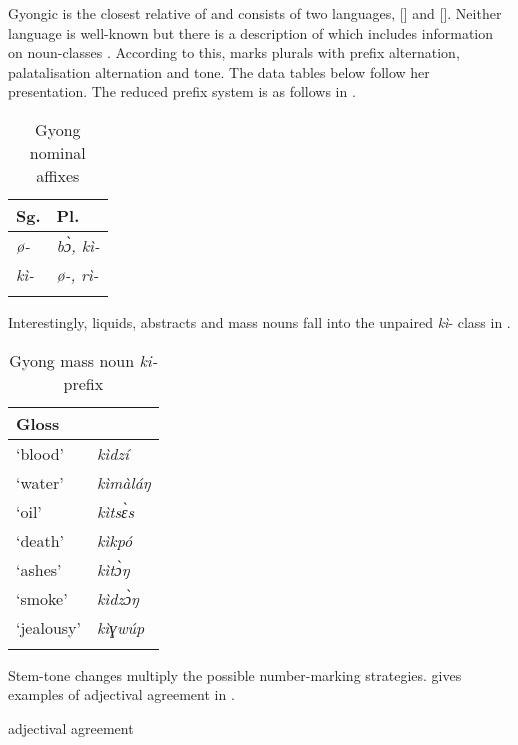 \documentclass[output=paper]{langsci/langscibook}
\begin{document}
Gyongic is the closest relative of  and consists of two languages,  [] and  []. Neither language is well-known but there is a description of  which includes information on noun-classes \citep{Hagen1988}. According to this,  marks plurals with prefix alternation, palatalisation alternation and tone. The data tables below follow her presentation. The reduced prefix system is as follows in .

\begin{table}
\caption{Gyong nominal affixes}
\label{extab:nomaffplat:16}
 \begin{tabularx}{.66\textwidth}{Xl}
 \lsptoprule
 {Sg.} 	& {Pl.}\\ 
\midrule
\itshape ø- 	& \itshape bɔ̀, kì-\\
\itshape kì- 	& \itshape ø-, rì-\\
\lspbottomrule
 \end{tabularx}
\end{table}

Interestingly, liquids, abstracts and mass nouns fall into the unpaired \textit{kì}- class in .

\begin{table}
\caption{Gyong mass noun \textit{ki-} prefix}   
\label{extab:nomaffplat:17}

\begin{tabularx}{.66\textwidth}{Xl}
\lsptoprule
Gloss 	&    {\ili{Gyong}}\\
\midrule
`blood' 	& \itshape kìdzí\\
`water' 	& \itshape kìmàláŋ\\
`oil' 	& \itshape kìtsɛ̀s\\
`death' 	& \itshape kìkpó\\
`ashes' 	& \itshape kìtɔ̀ŋ\\
`smoke' 	& \itshape kìdzɔ̀ŋ\\
`jealousy' 	& \itshape kìɣwúp\\
\lspbottomrule
\end{tabularx}
\end{table}


Stem-tone changes multiply the possible number-marking strategies. \citet[139]{Hagen1988} gives examples of adjectival agreement in .


\ea\label{ex:nomaffplat:18}
{  adjectival agreement} \\
\end{document}

